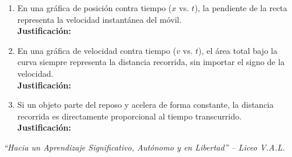 \documentclass[11pt, letterpaper]{article}
\newif\ifmostrarrespuestas
\newcommand{\respuesta}[1]{
	\ifmostrarrespuestas
	\par\vspace{0.2cm}
	\begin{tcolorbox}[colback=blue!5!white, colframe=valblue, coltext=blue!80!black, boxrule=0.5pt, arc=1mm, left=2mm, right=2mm, top=1.5mm, bottom=1.5mm]
		\footnotesize \textbf{\textcolor{valblue}{Solución Paso a Paso (Docente):}} #1
	\end{tcolorbox}
	\vspace{0.2cm}
	\fi
}
\begin{document}
\begin{enumerate}[leftmargin=*, itemsep=0.6cm]
\begin{enumerate}[label=\alph*., itemsep=0.3cm]
			\item \underline{\hspace{1.2cm}} En una gráfica de posición contra tiempo ($x$ vs. $t$), la pendiente de la recta representa la velocidad instantánea del móvil. \\[0.15cm]
			\textbf{Justificación:} \hrulefill \\[0.15cm] \mbox{}\hrulefill
			
			\item \underline{\hspace{1.2cm}} En una gráfica de velocidad contra tiempo ($v$ vs. $t$), el área total bajo la curva siempre representa la distancia recorrida, sin importar el signo de la velocidad. \\[0.15cm]
			\textbf{Justificación:} \hrulefill \\[0.15cm] \mbox{}\hrulefill
			
			\item \underline{\hspace{1.2cm}} Si un objeto parte del reposo y acelera de forma constante, la distancia recorrida es directamente proporcional al tiempo transcurrido. \\[0.15cm]
			\textbf{Justificación:} \hrulefill \\[0.15cm] \mbox{}\hrulefill
		\end{enumerate}
		\respuesta{
			\textbf{a) Falso (F):} Si la velocidad es negativa (avanzando hacia la izquierda) y la aceleración es negativa, el objeto aumenta su rapidez en sentido negativo (acelera en reversa). Solamente desacelera cuando velocidad y aceleración tienen signos opuestos.\\[0.1cm]
			\textbf{b) Verdadero (V):} La pendiente de la curva en la gráfica $x$ vs. $t$ está dada por $m = \frac{\Delta x}{\Delta t} = v$, que corresponde físicamente a la velocidad del objeto.\\[0.1cm]
			\textbf{c) Falso (F):} El área con signo algebraico da el \textbf{desplazamiento neto}. Para obtener la \textbf{distancia total} se deben sumar los valores absolutos de las áreas positiva y negativa.\\[0.1cm]
			\textbf{d) Falso (F):} Según la ecuación $x = \frac{1}{2} a t^2$, la distancia recorrida es directamente proporcional al \textbf{cuadrado del tiempo} ($t^2$), no al tiempo lineal.
		}
	\end{enumerate}
	
	\vfill
	\begin{center}
		\footnotesize \textit{\color{valdark!70} ``Hacia un Aprendizaje Significativo, Autónomo y en Libertad'' -- Liceo V.A.L.}
	\end{center}
	
\end{document}
